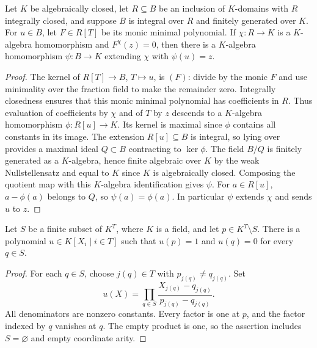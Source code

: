 \begin{lemma}
\label{lem:complex-closure-integral-lifting}
\leanok
Let $K$ be algebraically closed, let $R\subseteq B$ be an inclusion of
$K$-domains with $R$ integrally closed, and suppose $B$ is integral over
$R$ and finitely generated over $K$. For $u\in B$, let $F\in R[T]$ be
its monic minimal polynomial. If $\chi:R\to K$ is a $K$-algebra
homomorphism and $F^\chi(z)=0$, then there is a $K$-algebra
homomorphism $\psi:B\to K$ extending $\chi$ with $\psi(u)=z$.
\end{lemma}
\begin{proof}
The kernel of $R[T]\to B$, $T\mapsto u$, is $(F)$: divide by the
monic $F$ and use minimality over the fraction field to make the remainder
zero. Integrally closedness ensures that this monic minimal polynomial
has coefficients in $R$. Thus evaluation of coefficients by $\chi$ and
of $T$ by $z$ descends to a $K$-algebra homomorphism
$\phi:R[u]\to K$. Its kernel is maximal since $\phi$ contains all
constants in its image. The extension $R[u]\subseteq B$ is integral,
so lying over provides a maximal ideal $Q\subset B$ contracting to
$\ker\phi$. The field $B/Q$ is finitely generated as a $K$-algebra,
hence finite algebraic over $K$ by the weak Nullstellensatz and equal
to $K$ since $K$ is algebraically closed. Composing the quotient map
with this $K$-algebra identification gives $\psi$. For $a\in R[u]$,
$a-\phi(a)$ belongs to $Q$, so $\psi(a)=\phi(a)$. In particular
$\psi$ extends $\chi$ and sends $u$ to $z$.
\end{proof}

\begin{lemma}
\label{lem:complex-closure-finite-separator}
\leanok
Let $S$ be a finite subset of $K^T$, where $K$ is a field, and let
$p\in K^T\setminus S$. There is a polynomial $u\in K[X_i\mid i\in T]$
such that $u(p)=1$ and $u(q)=0$ for every $q\in S$.
\end{lemma}
\begin{proof}
For each $q\in S$, choose $j(q)\in T$ with $p_{j(q)}\ne q_{j(q)}$.
Set
\[
 u(X)=\prod_{q\in S}
 \frac{X_{j(q)}-q_{j(q)}}{p_{j(q)}-q_{j(q)}}.
\]
All denominators are nonzero constants. Every factor is one at $p$,
and the factor indexed by $q$ vanishes at $q$. The empty product is one,
so the assertion includes $S=\varnothing$ and empty coordinate arity.
\end{proof}

